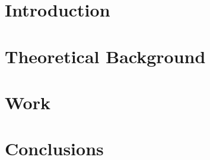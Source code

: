 \documentclass{include/thesisclass}
\begin{document}
    \FrontMatter

    
    
    

    \begingroup   %
    \tableofcontents                    %
    \listoffigures
    \listoftables
    \endgroup
    \cleardoublepage



    \MainMatter
    \chapter{Introduction}
    		
    \chapter{Theoretical Background}
    		
	\chapter{Work}
		
    \chapter{Conclusions}
    		

    \Appendix
    \chapter*{\appendixname} 



    \TheBibliography

    
    

\end{document}

